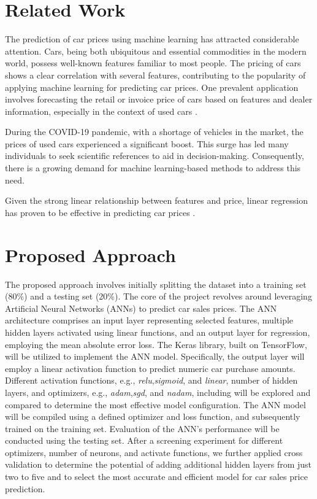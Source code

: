 \documentclass[sigplan,screen]{acmart}
\begin{document}
\section{Related Work}
The prediction of car prices using machine learning has attracted considerable attention. Cars, being both ubiquitous and essential commodities in the modern world, possess well-known features familiar to most people. The pricing of cars shows a clear correlation with several features, contributing to the popularity of applying machine learning for predicting car prices. One prevalent application involves forecasting the retail or invoice price of cars based on features and dealer information, especially in the context of used cars \citep{asghar2021used, narayana2022second}.

During the COVID-19 pandemic, with a shortage of vehicles in the market, the prices of used cars experienced a significant boost. This surge has led many individuals to seek scientific references to aid in decision-making. Consequently, there is a growing demand for machine learning-based methods to address this need.

Given the strong linear relationship between features and price, linear regression has proven to be effective in predicting car prices \citep{bukvic2022price, sumeyra2023using}.

\section{Proposed Approach} 

The proposed approach involves initially splitting the dataset into a training set (80\%) and a testing set (20\%). The core of the project revolves around leveraging Artificial Neural Networks (ANNs) to predict car sales prices. The ANN architecture comprises an input layer representing selected features, multiple hidden layers activated using linear functions, and an output layer for regression, employing the mean absolute error loss. The Keras library, built on TensorFlow, will be utilized to implement the ANN model. Specifically, the output layer will employ a linear activation function to predict numeric car purchase amounts. Different activation functions, e.g., {\it relu},{\it sigmoid}, and {\it linear}, number of hidden layers, and optimizers, e.g., {\it adam},{\it sgd}, and {\it nadam}, including will be explored and compared to determine the most effective model configuration. The ANN model will be compiled using a defined optimizer and loss function, and subsequently trained on the training set. Evaluation of the ANN's performance will be conducted using the testing set. After a screening experiment for different optimizers, number of neurons, and activate functions, we further applied cross validation to determine the potential of adding additional hidden layers from just two to five and to select the most accurate and efficient model for car sales price prediction.
\end{document}
